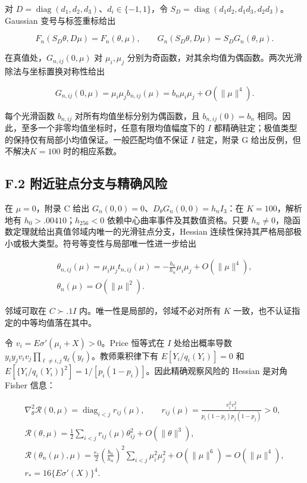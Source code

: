\documentclass[11pt,a4paper]{article}
\begin{document}
对 \(D=\operatorname{diag}(d_1,d_2,d_3)\)、\(d_i\in\{-1,1\}\)，令
\(S_D=\operatorname{diag}(d_1d_2,d_1d_3,d_2d_3)\)。Gaussian
变号与标签重标给出

\[
F_n(S_D\theta,D\mu)=F_n(\theta,\mu),\qquad
G_n(S_D\theta,D\mu)=S_DG_n(\theta,\mu).
\tag{F.3}
\]

在真值处，\(G_{n,ij}(0,\mu)\) 对 \(\mu_i,\mu_j\)
分别为奇函数，对其余均值为偶函数。两次光滑除法与坐标置换对称性给出

\[
G_{n,ij}(0,\mu)=\mu_i\mu_jb_{n,ij}(\mu)
=b_n\mu_i\mu_j+O(\|\mu\|^4).
\tag{F.4}
\]

每个光滑函数 \(b_{n,ij}\) 对所有均值坐标分别为偶函数，且
\(b_{n,ij}(0)=b_n\)
相同。因此，至多一个非零均值坐标时，任意有限均值幅度下的 \(I\)
都精确驻定；极值类型的保持仅有局部小均值保证。一般匹配均值不保证 \(I\)
驻定，附录 G 给出反例，但不解决\(K=100\) 时的相应系数。

\subsection*{F.2
附近驻点分支与精确风险}\label{f.2-ux9644ux8fd1ux9a7bux70b9ux5206ux652fux4e0eux7cbeux786eux98ceux9669}

在 \(\mu=0\)，附录 C 给出
\(G_n(0,0)=0\)、\(D_\theta G_n(0,0)=h_nI_3\)：在 \(K=100\)，解析地有
\(h_0>.00410\)；\(h_{256}<0\) 依赖中心曲率事件及其数值资格。只要
\(h_n\ne0\)，隐函数定理就给出真值邻域内唯一的光滑驻点分支，Hessian
连续性保持其严格局部极小或极大类型。符号等变性与局部唯一性进一步给出

\[
\begin{gathered}
\theta_{n,ij}(\mu)=\mu_i\mu_jt_{n,ij}(\mu)
=-\frac{b_n}{h_n}\mu_i\mu_j+O(\|\mu\|^4),\\
\theta_n(\mu)=O(\|\mu\|^2).
\end{gathered}
\tag{F.5}
\]

邻域可取在 \(C\succ.1I\) 内。唯一性是局部的，邻域不必对所有 \(K\)
一致，也不认证指定的中等均值落在其中。

令 \(v_i=E\sigma'(\mu_i+X)>0\)。Price 恒等式在 \(I\) 处给出概率导数
\(y_iy_jv_iv_j\prod_{\ell\ne i,j}q_\ell(y_\ell)\)。教师乘积律下有
\(E[Y_i/q_i(Y_i)]=0\) 和
\(E[\{Y_i/q_i(Y_i)\}^2]=1/[p_i(1-p_i)]\)。因此精确观察风险的 Hessian
是对角 Fisher 信息：

\[
\begin{gathered}
\nabla_\theta^2\mathcal R(0,\mu)=\operatorname{diag}_{i<j}r_{ij}(\mu),\qquad
r_{ij}(\mu)=\frac{v_i^2v_j^2}{p_i(1-p_i)p_j(1-p_j)}>0,\\
\mathcal R(\theta,\mu)=\frac12\sum_{i<j}r_{ij}(\mu)\theta_{ij}^2+O(\|\theta\|^3),\\
\mathcal R(\theta_n(\mu),\mu)
=\frac{r_*}{2}\left(\frac{b_n}{h_n}\right)^2\sum_{i<j}\mu_i^2\mu_j^2
+O(\|\mu\|^6)=O(\|\mu\|^4),\\
r_*=16\{E\sigma'(X)\}^4.
\end{gathered}
\tag{F.6}
\]
\end{document}
